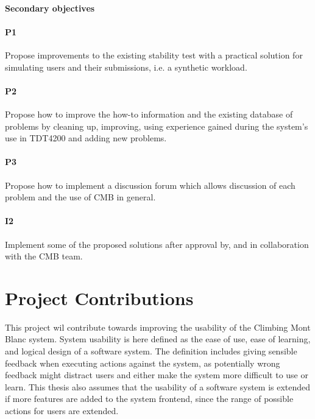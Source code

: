 \paragraph*{Secondary objectives} \hfill

\paragraph*{P1} Propose improvements to the existing stability test with a practical solution for simulating users and their submissions, i.e. a synthetic workload.

\paragraph*{P2}  Propose how to improve the how-to information and the existing database of problems by cleaning up, improving, using experience gained during the system's use in TDT4200 \cite{TDT4200} and adding new problems.

\paragraph*{P3} Propose how to implement a discussion forum which allows discussion of each problem and the use of CMB in general.

\paragraph*{I2} Implement some of the proposed solutions after approval by, and in collaboration with the CMB team. \\

\section{Project Contributions}
\label{sec:cont}
This project wil contribute towards improving the usability of the Climbing Mont Blanc system. System usability is here defined as the ease of use, ease of learning, and logical design of a software system. The definition includes giving sensible feedback when executing actions against the system, as potentially wrong feedback might distract users and either make the system more difficult to use or learn. This thesis also assumes that the usability of a software system is extended if more features are added to the system frontend, since the range of possible actions for users are extended. \\

